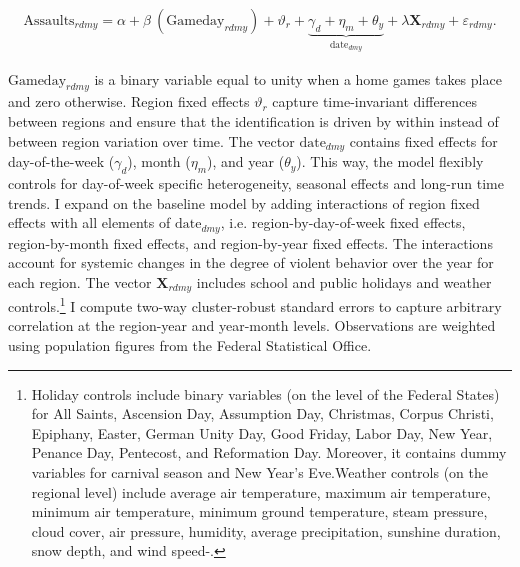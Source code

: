 \documentclass[11pt, a4paper]{article} %
\begin{document}
\begin{align}
	\text{Assaults}_{rdmy} = \alpha + \beta\ (\text{Gameday}_{rdmy}) + \vartheta_r + \underbrace{\gamma_d + \eta_m + \theta_y}_{\text{date}_{dmy}} + \lambda \mathbf{X}_{rdmy} + \varepsilon_{rdmy}
	\label{eq_soc_ext:model}.
\end{align}

$\text{Gameday}_{rdmy}$ is a binary variable equal to unity when a home games takes place and zero otherwise. Region fixed effects $\vartheta_r$ capture time-invariant differences between regions and ensure that the identification is driven by within instead of between region variation over time. The vector $\text{date}_{dmy}$ contains fixed effects for day-of-the-week ($\gamma_d$), month ($\eta_m$), and year ($\theta_y$). This way, the model flexibly controls for day-of-week specific heterogeneity, seasonal effects and long-run time trends. I expand on the baseline model by adding interactions of region fixed effects with all elements of $\text{date}_{dmy}$, i.e. region-by-day-of-week fixed effects, region-by-month fixed effects, and region-by-year fixed effects. The interactions account for systemic changes in the degree of violent behavior over the year for each region. The vector $\mathbf{X}_{rdmy}$ includes school and public holidays and weather controls.\footnote{Holiday controls include binary variables (on the level of the Federal States) for All Saints, Ascension Day, Assumption Day, Christmas, Corpus Christi, Epiphany, Easter, German Unity Day, Good Friday, Labor Day, New Year, Penance Day, Pentecost, and Reformation Day. Moreover, it contains dummy variables for carnival season and New Year's Eve.\newline Weather controls (on the regional level) include average air temperature, maximum air temperature, minimum air temperature, minimum ground temperature, steam pressure, cloud cover, air pressure, humidity, average precipitation, sunshine duration, snow depth, and wind speed-.} I compute two-way cluster-robust standard errors to capture arbitrary correlation at the region-year and year-month levels. Observations are weighted using population figures from the Federal Statistical Office.
\end{document}
